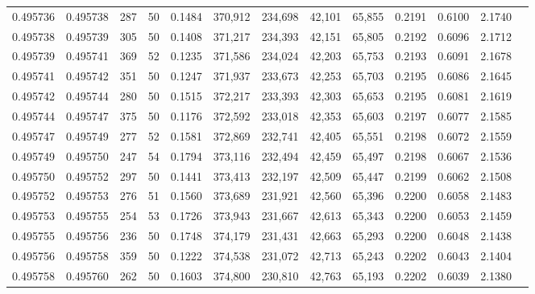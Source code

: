 \begin{tabular}{rrrrrrrrrrrrr}
0.495736 & 0.495738 &   287 &  50 &                                     0.1484 & 370,912 & 234,698 &  42,101 &  65,855 & 0.2191 & 0.6100 & 2.1740 \\
0.495738 & 0.495739 &   305 &  50 &                                     0.1408 & 371,217 & 234,393 &  42,151 &  65,805 & 0.2192 & 0.6096 & 2.1712 \\
0.495739 & 0.495741 &   369 &  52 &                                     0.1235 & 371,586 & 234,024 &  42,203 &  65,753 & 0.2193 & 0.6091 & 2.1678 \\
0.495741 & 0.495742 &   351 &  50 &                                     0.1247 & 371,937 & 233,673 &  42,253 &  65,703 & 0.2195 & 0.6086 & 2.1645 \\
0.495742 & 0.495744 &   280 &  50 &                                     0.1515 & 372,217 & 233,393 &  42,303 &  65,653 & 0.2195 & 0.6081 & 2.1619 \\
0.495744 & 0.495747 &   375 &  50 &                                     0.1176 & 372,592 & 233,018 &  42,353 &  65,603 & 0.2197 & 0.6077 & 2.1585 \\
0.495747 & 0.495749 &   277 &  52 &                                     0.1581 & 372,869 & 232,741 &  42,405 &  65,551 & 0.2198 & 0.6072 & 2.1559 \\
0.495749 & 0.495750 &   247 &  54 &                                     0.1794 & 373,116 & 232,494 &  42,459 &  65,497 & 0.2198 & 0.6067 & 2.1536 \\
0.495750 & 0.495752 &   297 &  50 &                                     0.1441 & 373,413 & 232,197 &  42,509 &  65,447 & 0.2199 & 0.6062 & 2.1508 \\
0.495752 & 0.495753 &   276 &  51 &                                     0.1560 & 373,689 & 231,921 &  42,560 &  65,396 & 0.2200 & 0.6058 & 2.1483 \\
0.495753 & 0.495755 &   254 &  53 &                                     0.1726 & 373,943 & 231,667 &  42,613 &  65,343 & 0.2200 & 0.6053 & 2.1459 \\
0.495755 & 0.495756 &   236 &  50 &                                     0.1748 & 374,179 & 231,431 &  42,663 &  65,293 & 0.2200 & 0.6048 & 2.1438 \\
0.495756 & 0.495758 &   359 &  50 &                                     0.1222 & 374,538 & 231,072 &  42,713 &  65,243 & 0.2202 & 0.6043 & 2.1404 \\
0.495758 & 0.495760 &   262 &  50 &                                     0.1603 & 374,800 & 230,810 &  42,763 &  65,193 & 0.2202 & 0.6039 & 2.1380 \\

\end{tabular}
